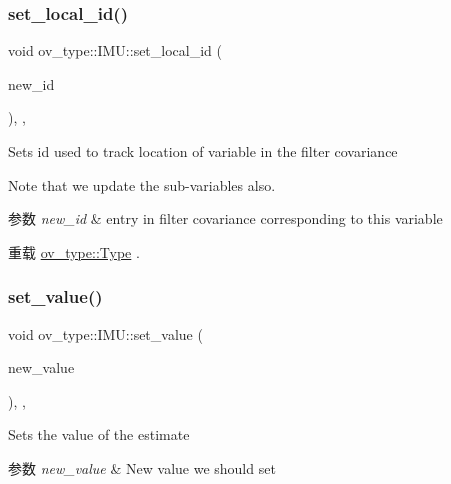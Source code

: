 \subsubsection{\texorpdfstring{set\+\_\+local\+\_\+id()}{set\_local\_id()}}
{\footnotesize\ttfamily void ov\+\_\+type\+::\+I\+M\+U\+::set\+\_\+local\+\_\+id (\begin{DoxyParamCaption}\item[{int}]{new\+\_\+id }\end{DoxyParamCaption})\hspace{0.3cm}{\ttfamily [inline]}, {\ttfamily [override]}, {\ttfamily [virtual]}}



Sets id used to track location of variable in the filter covariance 

Note that we update the sub-\/variables also.


\begin{DoxyParams}{参数}
{\em new\+\_\+id} & entry in filter covariance corresponding to this variable \\
\hline
\end{DoxyParams}


重载 \hyperlink{classov__type_1_1Type_a52cb2fe6e25dbe8875da3fd618cf0b61}{ov\+\_\+type\+::\+Type} .

\mbox{\label{classov__type_1_1IMU_a53586b4f92ba0110c2b2241fa26862a1}} 
\subsubsection{\texorpdfstring{set\+\_\+value()}{set\_value()}}
{\footnotesize\ttfamily void ov\+\_\+type\+::\+I\+M\+U\+::set\+\_\+value (\begin{DoxyParamCaption}\item[{const Eigen\+::\+Matrix\+Xd \&}]{new\+\_\+value }\end{DoxyParamCaption})\hspace{0.3cm}{\ttfamily [inline]}, {\ttfamily [override]}, {\ttfamily [virtual]}}



Sets the value of the estimate 


\begin{DoxyParams}{参数}
{\em new\+\_\+value} & New value we should set \\
\hline
\end{DoxyParams}


